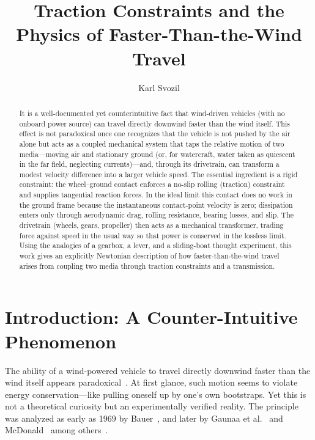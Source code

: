 \documentclass[reprint,aps,pra,longbibliography]{revtex4-2}
\begin{document}
\title{Traction Constraints and the Physics of Faster-Than-the-Wind Travel}

\author{Karl Svozil }

\begin{abstract}
It is a well-documented yet counterintuitive fact that wind-driven vehicles (with no onboard power source) can travel directly downwind faster than the wind itself. This effect is not paradoxical once one recognizes that the vehicle is not pushed by the air alone but acts as a coupled mechanical system that taps the relative motion of two media---moving air and stationary ground (or, for watercraft, water taken as quiescent in the far field, neglecting currents)---and, through its drivetrain, can transform a modest velocity difference into a larger vehicle speed. The essential ingredient is a rigid constraint: the wheel--ground contact enforces a no-slip rolling (traction) constraint and supplies tangential reaction forces. In the ideal limit this contact does no work in the ground frame because the instantaneous contact-point velocity is zero; dissipation enters only through aerodynamic drag, rolling resistance, bearing losses, and slip. The drivetrain (wheels, gears, propeller) then acts as a mechanical transformer, trading force against speed in the usual way so that power is conserved in the lossless limit. Using the analogies of a gearbox, a lever, and a sliding-boat thought experiment, this work gives an explicitly Newtonian description of how faster-than-the-wind travel arises from coupling two media through traction constraints and a transmission.
\end{abstract}

\maketitle

\section{Introduction: A Counter-Intuitive Phenomenon}

The ability of a wind-powered vehicle to travel directly downwind faster than the wind itself appears paradoxical~\cite{Blackford1978,Stong1975,McDonald2021}. At first glance, such motion seems to violate energy conservation---like pulling oneself up by one's own bootstraps. Yet this is not a theoretical curiosity but an experimentally verified reality. The principle was analyzed as early as 1969 by Bauer~\cite{Bauer1969,bauer1971sailing,bauer1974taking}, and later by  Gaunaa et al.~\cite{Gaunaa2009} and  McDonald~\cite{McDonald2021} among others~\cite{khan2013analysis,AAPT2013}.
\end{document}
